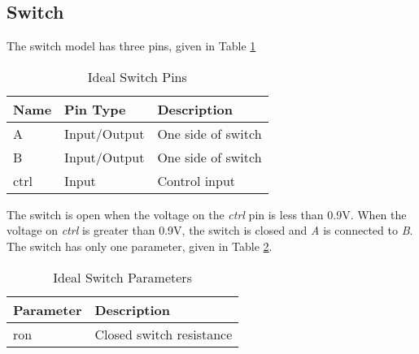 \subsection{Switch}
The switch model has three pins, given in Table \ref{tab:switchpins}
\begin{table}[htbp]
\begin{center}
\begin{tabular}{|l|l|l|}
\hline
Name & Pin Type & Description \\ \hline
A & Input/Output & One side of switch \\ \hline
B & Input/Output & One side of switch \\ \hline
ctrl & Input & Control input \\ \hline
\end{tabular}
\end{center}
\caption{Ideal Switch Pins}
\label{tab:switchpins}
\end{table}
The switch is open when the voltage on the \emph{ctrl} pin is less than 0.9V. When the voltage on \emph{ctrl} is greater than 0.9V, the switch is closed and \emph{A} is connected to \emph{B}. The switch has only one parameter, given in Table \ref{tab:switchparams}.
\begin{table}[htbp]
\begin{center}
\begin{tabular}{|l|l|}
\hline
Parameter & Description \\ \hline
ron & Closed switch resistance \\ \hline
\end{tabular}
\end{center}
\caption{Ideal Switch Parameters}
\label{tab:switchparams}
\end{table}

